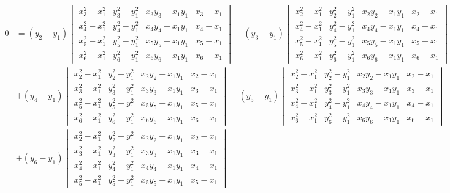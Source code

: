 \documentclass[12pt]{article}
\begin{document}
\begin{align}
 0 &= (y_2 - y_1) \begin{vmatrix}
        x_3^2 - x_1^2 & y_3^2 - y_1^2 & x_3 y_3 - x_1 y_1 & x_3 - x_1  \\
        x_4^2 - x_1^2 & y_4^2 - y_1^2 & x_4 y_4 - x_1 y_1 & x_4 - x_1  \\
        x_5^2 - x_1^2 & y_5^2 - y_1^2 & x_5 y_5 - x_1 y_1 & x_5 - x_1 \\
        x_6^2 - x_1^2 & y_6^2 - y_1^2 & x_6 y_6 - x_1 y_1 & x_6 - x_1
        \end{vmatrix}
        - (y_3 - y_1) \begin{vmatrix}
        x_2^2 - x_1^2 & y_2^2 - y_1^2 & x_2 y_2 - x_1 y_1 & x_2 - x_1  \\
        x_4^2 - x_1^2 & y_4^2 - y_1^2 & x_4 y_4 - x_1 y_1 & x_4 - x_1  \\
        x_5^2 - x_1^2 & y_5^2 - y_1^2 & x_5 y_5 - x_1 y_1 & x_5 - x_1 \\
        x_6^2 - x_1^2 & y_6^2 - y_1^2 & x_6 y_6 - x_1 y_1 & x_6 - x_1
        \end{vmatrix}\nonumber\\
        &+ (y_4 - y_1)  \begin{vmatrix}
        x_2^2 - x_1^2 & y_2^2 - y_1^2 & x_2 y_2 - x_1 y_1 & x_2 - x_1  \\
        x_3^2 - x_1^2 & y_3^2 - y_1^2 & x_3 y_3 - x_1 y_1 & x_3 - x_1  \\
        x_5^2 - x_1^2 & y_5^2 - y_1^2 & x_5 y_5 - x_1 y_1 & x_5 - x_1 \\
        x_6^2 - x_1^2 & y_6^2 - y_1^2 & x_6 y_6 - x_1 y_1 & x_6 - x_1
        \end{vmatrix} 
        - (y_5 - y_1) \begin{vmatrix}
        x_2^2 - x_1^2 & y_2^2 - y_1^2 & x_2 y_2 - x_1 y_1 & x_2 - x_1  \\
        x_3^2 - x_1^2 & y_3^2 - y_1^2 & x_3 y_3 - x_1 y_1 & x_3 - x_1  \\
        x_4^2 - x_1^2 & y_4^2 - y_1^2 & x_4 y_4 - x_1 y_1 & x_4 - x_1 \\
        x_6^2 - x_1^2 & y_6^2 - y_1^2 & x_6 y_6 - x_1 y_1 & x_6 - x_1
        \end{vmatrix} \nonumber\\
        &+ (y_6 - y_1)  \begin{vmatrix}
        x_2^2 - x_1^2 & y_2^2 - y_1^2 & x_2 y_2 - x_1 y_1 & x_2 - x_1  \\
        x_3^2 - x_1^2 & y_3^2 - y_1^2 & x_3 y_3 - x_1 y_1 & x_3 - x_1  \\
        x_4^2 - x_1^2 & y_4^2 - y_1^2 & x_4 y_4 - x_1 y_1 & x_4 - x_1 \\
        x_5^2 - x_1^2 & y_5^2 - y_1^2 & x_5 y_5 - x_1 y_1 & x_5 - x_1
        \end{vmatrix}
\end{align}
\end{document}
